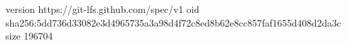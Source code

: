 version https://git-lfs.github.com/spec/v1
oid sha256:5dd736d33082e3d4965735a3a98d4f72c8ed8b62e8cc857faf1655d408d2da3c
size 196704

